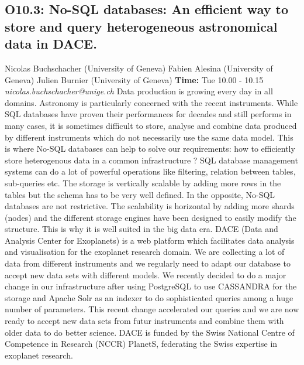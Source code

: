 \documentclass{report}
\begin{document}
\subsection*{O10.3: No-SQL databases: An efficient way to store and query heterogeneous astronomical data in DACE.}
\bigskip
Nicolas Buchschacher (University of Geneva) \newline Fabien Alesina (University of Geneva) \newline  Julien Burnier (University of Geneva)\newline   \newline  \newline  \newline\newline
{\bf Time:} Tue 10.00 - 10.15\newline
\newline
{\it nicolas.buchschacher@unige.ch}\newline
\newline\newline
Data production is growing every day in all domains. Astronomy is particularly concerned with the recent instruments. While SQL databases have proven their performances for decades and still performs in many cases, it is sometimes difficult to store, analyse and combine data produced by different instruments which do not necessarily use the same data model. This is where No-SQL databases can help to solve our requirements: how to efficiently store heterogenous data in a common infrastructure ?
SQL database management systems can do a lot of powerful operations like filtering, relation between tables, sub-queries etc. The storage is vertically scalable by adding more rows in the tables but the schema has to be very well defined. In the opposite, No-SQL databases are not restrictive. The scalability is horizontal by adding more shards (nodes) and the different storage engines have been designed to easily modify the structure. This is why it is well suited in the big data era.
DACE (Data and Analysis Center for Exoplanets) is a web platform which facilitates data analysis and visualisation for the exoplanet research domain. We are collecting a lot of data from different instruments and we regularly need to adapt our database to accept new data sets with different models. We recently decided to do a major change in our infrastructure after using PostgreSQL to use CASSANDRA for the storage and Apache Solr as an indexer to do sophisticated queries among a huge number of parameters. This recent change accelerated our queries and we are now ready to accept new data sets from futur instruments and combine them with older data to do better science.
DACE is funded by the Swiss National Centre of Competence in Research (NCCR) PlanetS, federating the Swiss expertise in exoplanet research.\newline
\newpage
\end{document}
